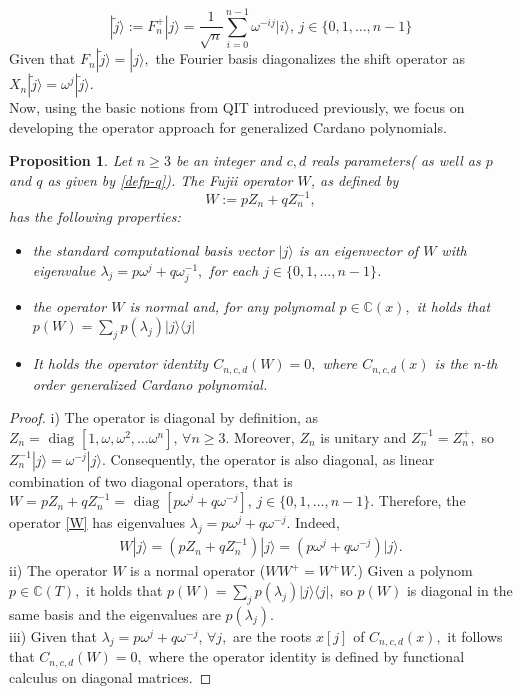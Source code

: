 \documentclass[11pt,reqno]{amsart}
\newtheorem{proposition}[theorem]{Proposition}
\newcommand{\ket}[1]{|#1\rangle} %
\newcommand{\bra}[1]{\langle#1|} %
\begin{document}
\begin{equation}
    \ket{\tilde{j}}:=F_n^+\ket{j}=\frac{1}{\sqrt{n}}\sum\limits_{i=0}^{n-1} \omega^{-ij}\ket{i},\, j\in\{0,1,\ldots, n-1\}
\end{equation}
Given that $F_n\ket{\tilde{j}}=\ket{j},$ the Fourier basis diagonalizes the shift operator as $X_n\ket{\tilde{j}}=\omega^j \ket{\tilde{j}}$.
\\Now, using the basic notions from QIT introduced previously,  we focus on  developing the operator approach for generalized Cardano polynomials.

\begin{proposition}
    Let $n\geq3$ be an integer and  $c, d$ reals parameters( as well as $p$ and $q$ as given by \eqref{defp-q}). The Fujii operator $W$, as defined by
\begin{equation}\label{W}
    W:=pZ_n+qZ_n^{-1},
\end{equation}
has the following properties:
\begin{itemize}
    \item[i)] the standard computational basis vector $\ket{j}$ is an eigenvector of $W$ with eigenvalue $\lambda_j=p\omega^j+q\omega_j^{-1},$ for each $ j\in\{0,1,\ldots, n-1\}$. 
\item[ii)]  the operator  $W$ is normal and, for any polynomal $p\in\mathbb{C}(x),$ it holds that $p(W)=\sum\limits_{j}p(\lambda_j)\ket{j}\bra{j}$  
\item[iii)] It holds the operator identity $C_{n,c,d}(W)=0,$ where $C_{n,c,d}(x)$ is  the  n-th order generalized Cardano polynomial.
\end{itemize}
    \end{proposition}
\begin{proof}
 i)   The operator is diagonal by definition, as $Z_n=\text{ diag }[1,\omega, \omega^2,\ldots \omega^n],\, \forall n\geq 3$. Moreover, $Z_n$ is unitary and $Z_n^{-1}=Z_n^+,$ so $Z_n^{-1}\ket{j}=\omega^{-j}\ket{j}$. Consequently, the operator is also diagonal, as linear combination of two diagonal operators, that is $W=pZ_n+qZ_n^{-1}=\text{ diag }[p\omega^j+q\omega^{-j}], \, j\in\{0,1,\ldots, n-1\}.$ Therefore,
 the operator \eqref{W} has eigenvalues $\lambda_j=p\omega^j+q\omega^{-j}$.  Indeed, 
\begin{eqnarray}
    W\ket{j}=(pZ_n+qZ_n^{-1})\ket{j}=(p\omega^j+q\omega^{-j})\ket{j}.
\end{eqnarray} 
ii) The operator $W$ is a normal operator ($WW^+=W^+W$.) Given a polynom $p\in \mathbb{C}(T),$ it holds that $p(W)=\sum_j p(\lambda_j)\ket{j}\bra{j},$ so $p(W)$ is diagonal in the same basis and the eigenvalues are $p(\lambda_j)$. 
\\iii) Given that $\lambda_j=p\omega^j+q\omega^{-j},\,\forall j,$ are the roots $x[j]$ of $C_{n,c,d}(x),$ it follows that $C_{n,c,d}(W)=0, $ where the operator identity is defined  by functional calculus on diagonal matrices.
\end{proof}
\end{document}
